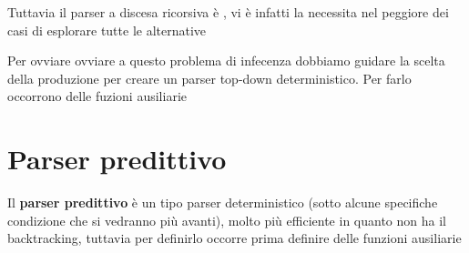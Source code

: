 Tuttavia il parser a discesa ricorsiva è , vi è infatti la necessita nel peggiore dei casi di esplorare tutte le alternative


Per ovviare ovviare a questo problema di infecenza dobbiamo guidare la scelta della produzione per creare un parser top-down deterministico. Per farlo occorrono delle fuzioni ausiliarie

\section{Parser predittivo}
Il \textbf{parser predittivo} è un tipo parser deterministico (sotto alcune specifiche condizione che si vedranno più avanti), molto più efficiente in quanto non ha il backtracking, tuttavia per definirlo occorre prima definire delle funzioni ausiliarie
